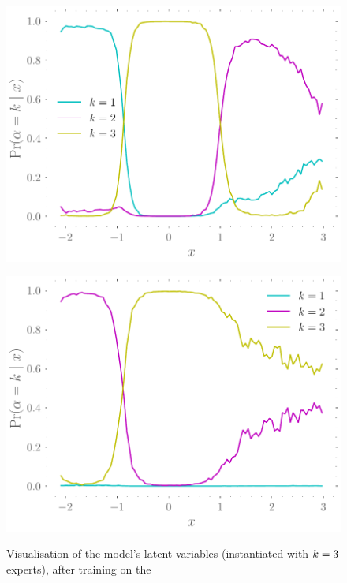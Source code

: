 \documentclass{mimosis-class/mimosis}
\numberwithin{equation}{chapter}
\newcommand{\modeInd}{\ensuremath{k}}
\newcommand{\ModeInd}{\ensuremath{\MakeUppercase{\modeInd}}}
\begin{document}
{\begin{figure}[hbt!]
\begin{minipage}[r]{0.49\textwidth}
\centering
\includegraphics[width=\textwidth]{./images/model/mcycle/K=3_L2/gating_mixing_probs.pdf}
\label{fig-mixing-probs-mcycle-three-experts-tight}
\end{minipage}
\begin{minipage}[r]{0.49\textwidth}
\centering
\includegraphics[width=\textwidth]{./images/model/mcycle/K=3_L3/gating_mixing_probs.pdf}
\label{fig-mixing-probs-mcycle-three-experts-further}
\end{minipage}
\caption[\acrshort{mosvgpe}'s latent variables' posteriors with $\ModeInd=3$ after training on motorcycle data set with $\furtherBound$ and $\furtherBoundTwo$]{Visualisation of the model's latent variables (instantiated with $\ModeInd=3$ experts), after training on the
}
\end{figure}}
\end{document}
